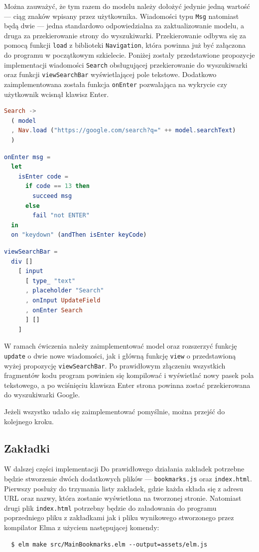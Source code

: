 \documentclass[twoside,a4paper]{report}
\begin{document}
Można zauważyć, że tym razem do modelu należy dołożyć jedynie jedną wartość --- ciąg znaków wpisany przez użytkownika.
Wiadomości typu \texttt{Msg} natomiast będą dwie --- jedna standardowo odpowiedzialna za zaktualizowanie modelu, a druga za przekierowanie strony do wyszukiwarki.
Przekierowanie odbywa się za pomocą funkcji \texttt{load} z biblioteki \texttt{Navigation}, która powinna już być załączona do programu w początkowym szkielecie.
Poniżej zostały przedstawione propozycje implementacji wiadomości \texttt{Search} obsługującej przekierowanie do wyszukiwarki oraz funkcji \texttt{viewSearchBar} wyświetlającej pole tekstowe.
Dodatkowo zaimplementowana została funkcja \texttt{onEnter} pozwalająca na wykrycie czy użytkownik wcisnął klawisz Enter.
\begin{lstlisting}[language=Elm]
Search ->
  ( model
  , Nav.load ("https://google.com/search?q=" ++ model.searchText)
  )
\end{lstlisting}
\begin{minipage}{.56\textwidth}
\begin{lstlisting}[language=Elm]
onEnter msg =
  let
    isEnter code =
      if code == 13 then
        succeed msg
      else
        fail "not ENTER"
  in
  on "keydown" (andThen isEnter keyCode)
\end{lstlisting}
\end{minipage}\hfill
\begin{minipage}{.38\textwidth}
\begin{lstlisting}[language=Elm]
viewSearchBar =
  div []
    [ input
      [ type_ "text"
      , placeholder "Search"
      , onInput UpdateField
      , onEnter Search
      ] []
    ]
\end{lstlisting}
\end{minipage}\hfill

W ramach ćwiczenia należy zaimplementować model oraz rozszerzyć funkcję \texttt{update} o dwie nowe wiadomości, jak i główną funkcję \texttt{view} o przedstawioną wyżej propozycję \texttt{viewSearchBar}.
Po prawidłowym złączeniu wszystkich fragmentów kodu program powinien się kompilować i wyświetlać nowy pasek pola tekstowego, a po wciśnięciu klawisza Enter strona powinna zostać przekierowana do wyszukiwarki Google.

Jeżeli wszystko udało się zaimplementować pomyślnie, można przejść do kolejnego kroku.

\subsection*{Zakładki}
W dalszej części implementacji
Do prawidłowego działania zakładek potrzebne będzie stworzenie dwóch dodatkowych plików --- \texttt{bookmarks.js} oraz \texttt{index.html}.
Pierwszy posłuży do trzymania listy zakładek, gdzie każda składa się z adresu URL oraz nazwy, która zostanie wyświetlona na tworzonej stronie.
Natomiast drugi plik \texttt{index.html} potrzebny będzie do załadowania do programu poprzedniego pliku z zakładkami jak i pliku wynikowego stworzonego przez kompilator Elma z użyciem następującej komendy:
\begin{lstlisting}
  $ elm make src/MainBookmarks.elm --output=assets/elm.js
\end{lstlisting}
\end{document}
